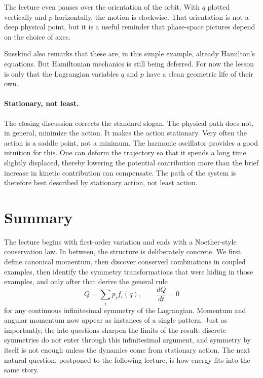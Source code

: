 The lecture even pauses over the orientation of the orbit. With \(q\) plotted vertically and \(p\) horizontally, the motion is clockwise. That orientation is not a deep physical point, but it is a useful reminder that phase-space pictures depend on the choice of axes.

Susskind also remarks that these are, in this simple example, already Hamilton's equations. But Hamiltonian mechanics is still being deferred. For now the lesson is only that the Lagrangian variables \(q\) and \(p\) have a clean geometric life of their own.

\paragraph{Stationary, not least.} The closing discussion corrects the standard slogan. The physical path does not, in general, minimize the action. It makes the action stationary. Very often the action is a saddle point, not a minimum. The harmonic oscillator provides a good intuition for this. One can deform the trajectory so that it spends a long time slightly displaced, thereby lowering the potential contribution more than the brief increase in kinetic contribution can compensate. The path of the system is therefore best described by stationary action, not least action.

\section{Summary}

The lecture begins with first-order variation and ends with a Noether-style conservation law. In between, the structure is deliberately concrete. We first define canonical momentum, then discover conserved combinations in coupled examples, then identify the symmetry transformations that were hiding in those examples, and only after that derive the general rule
\begin{equation}
Q=\sum_i p_i f_i(q),
\qquad
\frac{dQ}{dt}=0
\end{equation}
for any continuous infinitesimal symmetry of the Lagrangian. Momentum and angular momentum now appear as instances of a single pattern. Just as importantly, the late questions sharpen the limits of the result: discrete symmetries do not enter through this infinitesimal argument, and symmetry by itself is not enough unless the dynamics come from stationary action. The next natural question, postponed to the following lecture, is how energy fits into the same story.